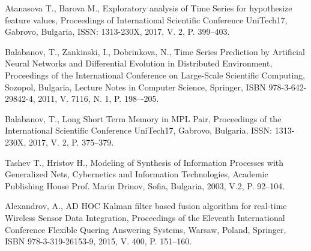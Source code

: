 \documentclass[11pt]{article}
\begin{document}
\begin{thebibliography}{99}

 Atanasova T., Barova M., Exploratory analysis of Time Series for hypothesize feature values, Proceedings of International Scientific Conference UniTech17, Gabrovo, Bulgaria, ISSN: 1313-230X, 2017, V. 2, P. 399--403.

 Balabanov, T., Zankinski, I., Dobrinkova, N., Time Series Prediction by Artificial Neural Networks and Differential Evolution in Distributed Environment, Proceedings of the International Conference on Large-Scale Scientific Computing, Sozopol, Bulgaria, Lecture Notes in Computer Science, Springer, ISBN 978-3-642-29842-4, 2011, V. 7116, N. 1, P. 198–-205. 

 Balabanov, T., Long Short Term Memory in MPL Pair, Proceedings of the  International Scientific Conference UniTech17, Gabrovo, Bulgaria, ISSN: 1313-230X, 2017, V. 2, P. 375--379.

 Tashev T., Hristov H., Modeling of Synthesis of Information Processes with Generalized Nets, Cybernetics and Information Technologies, Academic Publishing House Prof. Marin Drinov, Sofia, Bulgaria, 2003, V.2, P. 92--104.

 Alexandrov, A., AD HOC Kalman filter based fusion algorithm for real-time Wireless Sensor Data Integration, Proceedings of the Eleventh International Conference Flexible Quering Answering Systems, Warsaw, Poland, Springer, ISBN 978-3-319-26153-9, 2015, V. 400, P. 151--160.

\end{thebibliography}
\end{document}
